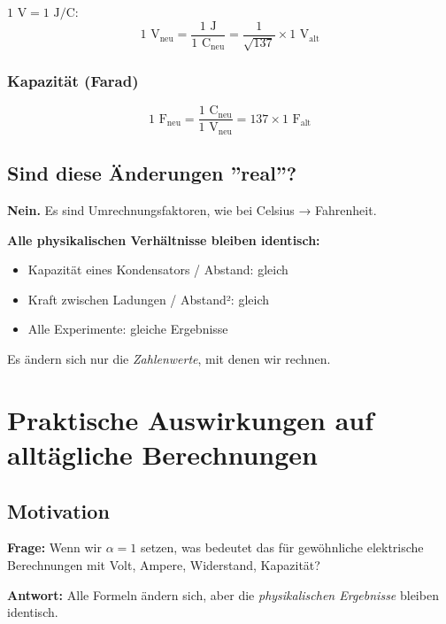 	$1 \text{ V} = 1 \text{ J/C}$:
	\begin{equation}
		1 \text{ V}_{\text{neu}} = \frac{1 \text{ J}}{1 \text{ C}_{\text{neu}}} = \frac{1}{\sqrt{137}} \times 1 \text{ V}_{\text{alt}}
	\end{equation}
	
	\subsubsection{Kapazität (Farad)}
	
	\begin{equation}
		1 \text{ F}_{\text{neu}} = \frac{1 \text{ C}_{\text{neu}}}{1 \text{ V}_{\text{neu}}} = 137 \times 1 \text{ F}_{\text{alt}}
	\end{equation}
	
	\subsection{Sind diese Änderungen ''real''?}
	
	\textbf{Nein.} Es sind Umrechnungsfaktoren, wie bei Celsius → Fahrenheit.
	
	\textbf{Alle physikalischen Verhältnisse bleiben identisch:}
	\begin{itemize}
		\item Kapazität eines Kondensators / Abstand: gleich
		\item Kraft zwischen Ladungen / Abstand²: gleich
		\item Alle Experimente: gleiche Ergebnisse
	\end{itemize}
	
	Es ändern sich nur die \textit{Zahlenwerte}, mit denen wir rechnen.
	
	\section{Praktische Auswirkungen auf alltägliche Berechnungen}
	\label{sec:practical_calculations}
	
	\subsection{Motivation}
	
	\textbf{Frage:} Wenn wir $\alpha = 1$ setzen, was bedeutet das für gewöhnliche elektrische Berechnungen mit Volt, Ampere, Widerstand, Kapazität?
	
	\textbf{Antwort:} Alle Formeln ändern sich, aber die \textit{physikalischen Ergebnisse} bleiben identisch.
	
